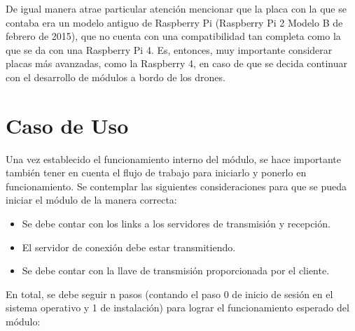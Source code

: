 De igual manera atrae particular atención mencionar que la placa con la que se contaba era un modelo antiguo de Raspberry Pi (Raspberry Pi 2 Modelo B de febrero de 2015), que no cuenta con una compatibilidad tan completa como la que se da con una Raspberry Pi 4. Es, entonces, muy importante considerar placas más avanzadas, como la Raspberry 4, en caso de que se decida continuar con el desarrollo de módulos a bordo de los drones.  


\section{Caso de Uso}

Una vez establecido el funcionamiento interno del módulo, se hace importante también tener en cuenta el flujo de trabajo para iniciarlo y ponerlo en funcionamiento. Se contemplar las siguientes consideraciones para que se pueda iniciar el módulo de la manera correcta:

\begin{itemize}

	\item Se debe contar con los links a los servidores de transmisión y recepción.
	\item El servidor de conexión debe estar transmitiendo.
	\item Se debe contar con la llave de transmisión proporcionada por el cliente.

\end{itemize}

En total, se debe seguir n pasos (contando el paso 0 de inicio de sesión en el sistema operativo y 1 de instalación) para lograr el funcionamiento esperado del módulo:

